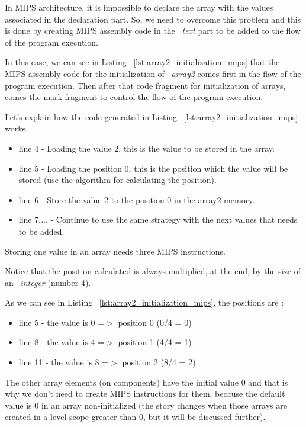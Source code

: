 \documentclass[
  oneside,
  11pt, a4paper,
  footinclude=true,
  headinclude=true,
  cleardoublepage=empty
]{scrbook}
\begin{document}
In MIPS architecture, it is impossible to declare the array with the values associated in the declaration part. So, we need to overcome this problem and this is done by creating MIPS assembly code in the ~\textit{text} part to be added to the flow of the program execution.

In this case, we can see in Listing ~\ref{lst:array2_initialization_mips} that the MIPS assembly code for the initialization of ~\textit{array2} comes first in the flow of the program execution. Then after that code fragment for initialization of arrays, comes the mark fragment to control the flow of the program execution.

Let's explain how the code generated in Listing ~\ref{lst:array2_initialization_mips} works.
\begin{itemize}
\item line 4 - Loading the value 2, this is the value to be stored in the array.
\item line 5 - Loading the position 0, this is the position which the value will be stored (use the algorithm for calculating the position).
\item line 6 - Store the value 2 to the position 0 in the array2 memory.
\item line 7.... - Continue to use the same strategy with the next values that needs to be added.
\end{itemize}

Storing one value in an array needs three MIPS instructions.

Notice that the position calculated is always multiplied, at the end, by the size of an ~\textit{integer} (number 4).

As we can see in Listing ~\ref{lst:array2_initialization_mips}, the positions are :

\begin{itemize}
\item line 5 - the value is 0 =$>$ position 0 (0/4 = 0)
\item line 8 - the value is 4 =$>$ position 1 (4/4 = 1)
\item line 11 - the value is 8 =$>$ position 2 (8/4 = 2)
\end{itemize}

The other array elements (on components) have the initial value 0 and that is why we don't need to create MIPS instructions for them, because the default value is 0 in an array non-initialized (the story changes when those arrays are created in a level scope greater than 0, but it will be discussed further).
\end{document}
